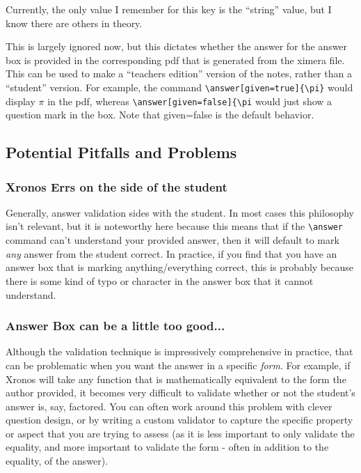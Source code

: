 \documentclass{ximera}
\begin{document}
\begin{description}
    Currently, the only value I remember for this key is the ``string'' value, but I know there are others in theory.
    
    \item[given:] This is largely ignored now, but this dictates whether the answer for the answer box is provided in the corresponding pdf that is generated from the ximera file. This can be used to make a ``teachers edition'' version of the notes, rather than a ``student'' version. For example, the command \verb|\answer[given=true]{\pi}| would display $\pi$ in the pdf, whereas \verb|\answer[given=false]{\pi| would just show a question mark in the box. Note that given=false is the default behavior.
    
\end{description}
    
    
\subsection*{Potential Pitfalls and Problems}    

    \subsubsection*{Xronos Errs on the side of the student}
    
        Generally, answer validation sides with the student. In most cases this philosophy isn't relevant, but it is noteworthy here because this means that if the \verb|\answer| command can't understand your provided answer, then it will default to mark \textit{any} answer from the student correct. In practice, if you find that you have an answer box that is marking anything/everything correct, this is probably because there is some kind of typo or character in the answer box that it cannot understand.

    \subsubsection*{Answer Box can be a little too good...} 
        
        Although the validation technique is impressively comprehensive in practice, that can be problematic when you want the answer in a specific \textit{form}. For example, if Xronos will take any function that is mathematically equivalent to the form the author provided, it becomes very difficult to validate whether or not the student's answer is, say, factored. You can often work around this problem with clever question design, or by writing a custom validator to capture the specific property or aspect that you are trying to assess (as it is less important to only validate the equality, and more important to validate the form - often in addition to the equality, of the answer).
        
\end{document}
